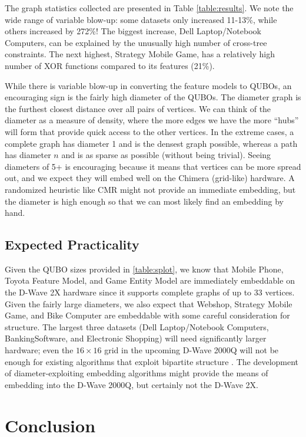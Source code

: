 \documentclass{sig-alternate-05-2015}
\begin{document}
The graph statistics collected are presented in Table \ref{table:results}. We note the wide range of variable blow-up: some datasets only increased 11-13\%, while others increased by 272\%! The biggest increase, Dell Laptop/Notebook Computers, can be explained by the unusually high number of cross-tree constraints. The next highest, Strategy Mobile Game, has a relatively high number of XOR functions compared to its features (21\%).

While there is variable blow-up in converting the feature models to QUBOs, an encouraging sign is the fairly high diameter of the QUBOs. The diameter graph is the furthest closest distance over all pairs of vertices. We can think of the diameter as a measure of density, where the more edges we have the more ``hubs'' will form that provide quick access to the other vertices. In the extreme cases, a complete graph has diameter 1 and is the densest graph possible, whereas a path has diameter $n$ and is as sparse as possible (without being trivial). Seeing diameters of 5+ is encouraging because it means that vertices can be more spread out, and we expect they will embed well on the Chimera (grid-like) hardware. A randomized heuristic like CMR \cite{cai2014practical} might not provide an immediate embedding, but the diameter is high enough so that we can most likely find an embedding by hand.

\subsection{Expected Practicality}
Given the QUBO sizes provided in \ref{table:splot}, we know that Mobile Phone, Toyota Feature Model, and Game Entity Model are immediately embeddable on the D-Wave 2X hardware since it supports complete graphs of up to 33 vertices. Given the fairly large diameters, we also expect that Webshop, Strategy Mobile Game, and Bike Computer are embeddable with some careful consideration for structure. The largest three datasets (Dell Laptop/Notebook Computers, BankingSoftware, and Electronic Shopping) will need significantly larger hardware; even the $16 \times 16$ grid in the upcoming D-Wave 2000Q will not be enough for existing algorithms that exploit bipartite structure \cite{goodrich2016graph}. The development of diameter-exploiting embedding algorithms might provide the means of embedding into the D-Wave 2000Q, but certainly not the D-Wave 2X.

\section{Conclusion}
\end{document}
